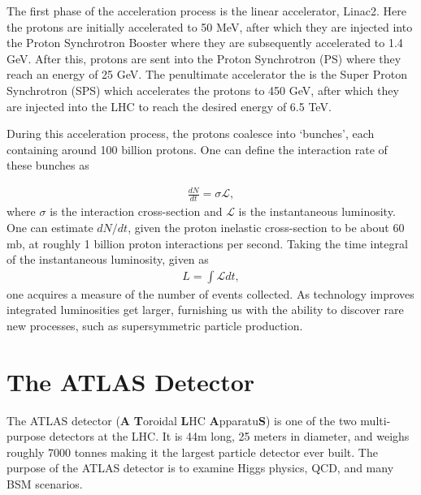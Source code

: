 \noindent The first phase of the acceleration process is the linear accelerator, Linac2. 
Here the protons are initially accelerated to 50 MeV, after which they are injected into the Proton Synchrotron Booster where they are subsequently accelerated to 1.4 GeV.
After this, protons are sent into the Proton Synchrotron (PS) where they reach an energy of 25 GeV.
The penultimate accelerator the is the Super Proton Synchrotron (SPS) which accelerates the protons to 450 GeV, after which they are injected into the LHC to reach the desired energy of 6.5 TeV.

During this acceleration process, the protons coalesce into `bunches', each containing around 100 billion protons.
One can define the interaction rate of these bunches as

\begin{align}
\frac{d N}{d t} = \sigma \mathcal{L},
\end{align}
where $\sigma$ is the interaction cross-section and $\mathcal{L}$ is the instantaneous luminosity.
One can estimate $dN/dt$, given the proton inelastic cross-section to be about 60 mb, at roughly 1 billion proton interactions per second.
Taking the time integral of the instantaneous luminosity, given as
\begin{align}
L = \int \mathcal{L} dt,
\end{align}
one acquires a measure of the number of events collected. 
As technology improves integrated luminosities get larger, furnishing us with the ability to discover rare new processes, such as supersymmetric particle production.

\section{The ATLAS Detector}
The ATLAS detector (\textbf{A} \textbf{T}oroidal \textbf{L}HC \textbf{A}pparatu\textbf{S}) is one of the two multi-purpose detectors at the LHC.
It is 44m long, 25 meters in diameter, and weighs roughly 7000 tonnes making it the largest particle detector ever built.
The purpose of the ATLAS detector is to examine Higgs physics, QCD, and many BSM scenarios.

